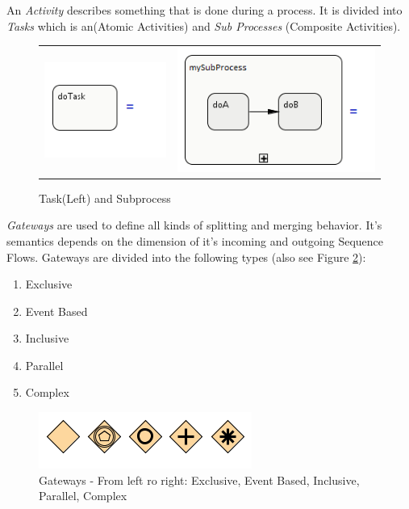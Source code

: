  
An \textit{Activity} describes something that is done during a process. It is divided into \textit{Tasks} which is an(Atomic Activities) and \textit{Sub Processes} (Composite Activities).\\
\begin{figure}[h]
\centering
\begin{tabular}{cc}
\includegraphics{images/mapping/task.png} & \includegraphics{images/mapping/subprocess.png}
\end{tabular}
\caption{Task(Left) and Subprocess}%
\label{fig:task+subprocess}%
\end{figure}

\newpage
\textit{Gateways} are used to define all kinds of splitting and merging behavior. It's semantics depends on the dimension of it's incoming and outgoing Sequence Flows. Gateways are divided into the following types (also see Figure \ref{fig:gateways}):\\
\begin{enumerate}
	\item Exclusive
	\item Event Based
	\item Inclusive
	\item Parallel
	\item Complex
\end{enumerate}



\begin{figure}[htbp]
	\centering
		\includegraphics{images/gateways.png}
	\caption{Gateways - From left ro right: Exclusive, Event Based, Inclusive, Parallel, Complex}
	\label{fig:gateways}
\end{figure}



